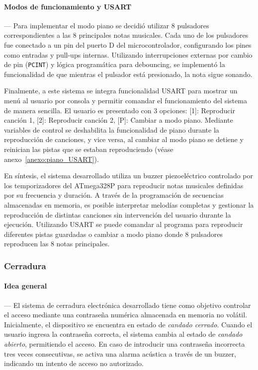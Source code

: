     \vspace{1em}

    \paragraph*{\textbf{Modos de funcionamiento y USART}}---
    Para implementar el modo piano se decidió utilizar 8 pulsadores correspondientes a las 8 principales notas musicales. Cada uno de los pulsadores fue conectado a un pin del puerto D del microcontrolador, configurando los pines como entradas y pull-ups internas. Utilizando interrupciones externas por cambio de pin (\texttt{PCINT}) y lógica programática para debouncing, se implementó la funcionalidad de que mientras el pulsador está presionado, la nota sigue sonando.

    \vspace{1em}

    Finalmente, a este sistema se integra funcionalidad USART para mostrar un menú al usuario por consola y permitir comandar el funcionamiento del sistema de manera sencilla. El usuario es presentado con 3 opciones: [1]: Reproducir canción 1, [2]: Reproducir canción 2, [P]: Cambiar a modo piano. Mediante variables de control se deshabilita la funcionalidad de piano durante la reproducción de canciones, y vice versa, al cambiar al modo piano se detiene y reinician las pistas que se estaban reproduciendo (véase anexo~\ref{anexo:piano_USART}).

    \vspace{1em}

    En síntesis, el sistema desarrollado utiliza un buzzer piezoeléctrico controlado por los temporizadores del ATmega328P para reproducir notas musicales definidas por su frecuencia y duración. A través de la programación de secuencias almacenadas en memoria, es posible interpretar melodías completas y gestionar la reproducción de distintas canciones sin intervención del usuario durante la ejecución. Utilizando USART se puede comandar al programa para reproducir diferentes pistas guardadas o cambiar a modo piano donde 8 pulsadores reproducen las 8 notas principales.

    \vspace{1em}

\subsubsection{\textbf{Cerradura}}
    \paragraph*{\textbf{Idea general}}---
    El sistema de cerradura electrónica desarrollado tiene como objetivo controlar el acceso mediante una contraseña numérica almacenada en memoria no volátil. Inicialmente, el dispositivo se encuentra en estado de \textit{candado cerrado}. Cuando el usuario ingresa la contraseña correcta, el sistema cambia al estado de \textit{candado abierto}, permitiendo el acceso. En caso de introducir una contraseña incorrecta tres veces consecutivas, se activa una alarma acústica a través de un buzzer, indicando un intento de acceso no autorizado.

